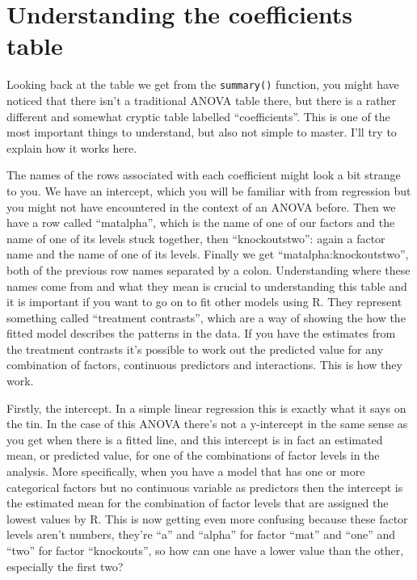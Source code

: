 \documentclass[
]{book}
\begin{document}
\hypertarget{understanding-the-coefficients-table}{%
\section{Understanding the coefficients table}\label{understanding-the-coefficients-table}}

Looking back at the table we get from the \texttt{summary()} function, you might have noticed that there isn't a traditional ANOVA table there, but there is a rather different and somewhat cryptic table labelled ``coefficients''. This is one of the most important things to understand, but also not simple to master. I'll try to explain how it works here.

The names of the rows associated with each coefficient might look a bit strange to you. We have an intercept, which you will be familiar with from regression but you might not have encountered in the context of an ANOVA before. Then we have a row called ``matalpha'', which is the name of one of our factors and the name of one of its levels stuck together, then ``knockoutstwo'': again a factor name and the name of one of its levels. Finally we get ``matalpha:knockoutstwo'', both of the previous row names separated by a colon. Understanding where these names come from and what they mean is crucial to understanding this table and it is important if you want to go on to fit other models using R. They represent something called ``treatment contrasts'', which are a way of showing the how the fitted model describes the patterns in the data. If you have the estimates from the treatment contrasts it's possible to work out the predicted value for any combination of factors, continuous predictors and interactions. This is how they work.

Firstly, the intercept. In a simple linear regression this is exactly what it says on the tin. In the case of this ANOVA there's not a y-intercept in the same sense as you get when there is a fitted line, and this intercept is in fact an estimated mean, or predicted value, for one of the combinations of factor levels in the analysis. More specifically, when you have a model that has one or more categorical factors but no continuous variable as predictors then the intercept is the estimated mean for the combination of factor levels that are assigned the lowest values by R. This is now getting even more confusing because these factor levels aren't numbers, they're ``a'' and ``alpha'' for factor ``mat'' and ``one'' and ``two'' for factor ``knockouts'', so how can one have a lower value than the other, especially the first two?
\end{document}
